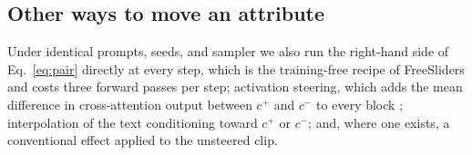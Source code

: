 \subsection{Other ways to move an attribute}

Under identical prompts, seeds, and sampler we also run the right-hand side of Eq.~\eqref{eq:pair} directly at every step, which is the training-free recipe of FreeSliders and costs three forward passes per step; activation steering, which adds the mean difference in cross-attention output between $c^+$ and $c^-$ to every block \citep{staniszewski2026tada}; interpolation of the text conditioning toward $c^+$ or $c^-$; and, where one exists, a conventional effect applied to the unsteered clip.
